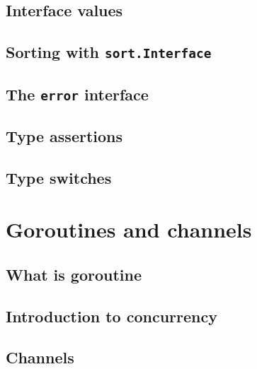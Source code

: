 \documentclass[]{book}
\begin{document}
\hypertarget{interface-values}{%
\section{Interface values}\label{interface-values}}

\hypertarget{sorting-with-sort.interface}{%
\section{\texorpdfstring{Sorting with \texttt{sort.Interface}}{Sorting with sort.Interface}}\label{sorting-with-sort.interface}}

\hypertarget{the-error-interface}{%
\section{\texorpdfstring{The \texttt{error} interface}{The error interface}}\label{the-error-interface}}

\hypertarget{type-assertions}{%
\section{Type assertions}\label{type-assertions}}

\hypertarget{type-switches}{%
\section{Type switches}\label{type-switches}}

\hypertarget{goroutines-and-channels}{%
\chapter{Goroutines and channels}\label{goroutines-and-channels}}

\hypertarget{what-is-goroutine}{%
\section{What is goroutine}\label{what-is-goroutine}}

\hypertarget{introduction-to-concurrency}{%
\section{Introduction to concurrency}\label{introduction-to-concurrency}}

\hypertarget{channels}{%
\section{Channels}\label{channels}}
\end{document}
